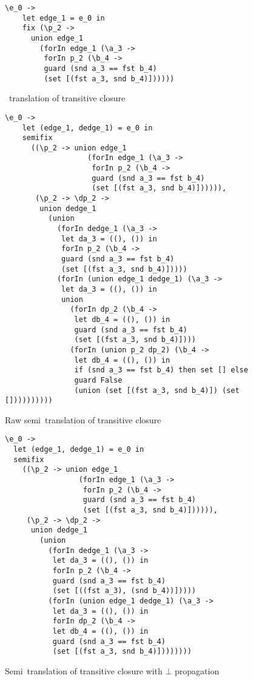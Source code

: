 \begin{figure}[p]\footnotesize
  \begin{lstlisting}[gobble=2]
  \e_0 ->
    let edge_1 = e_0 in
    fix (\p_2 ->
      union edge_1
        (forIn edge_1 (\a_3 ->
         forIn p_2 (\b_4 ->
         guard (snd a_3 == fst b_4)
         (set [(fst a_3, snd b_4)])))))
  \end{lstlisting}
  \caption{\Naive\ translation of transitive closure}
  \label{figure-trans-naive}
\end{figure}

\begin{figure}[p]\footnotesize
  \begin{lstlisting}[gobble=2]
  \e_0 ->
    let (edge_1, dedge_1) = e_0 in
    semifix
      ((\p_2 -> union edge_1
                   (forIn edge_1 (\a_3 ->
                    forIn p_2 (\b_4 ->
                    guard (snd a_3 == fst b_4)
                    (set [(fst a_3, snd b_4)]))))),
       (\p_2 -> \dp_2 ->
        union dedge_1
          (union
            (forIn dedge_1 (\a_3 ->
             let da_3 = ((), ()) in
             forIn p_2 (\b_4 ->
             guard (snd a_3 == fst b_4)
             (set [(fst a_3, snd b_4)]))))
            (forIn (union edge_1 dedge_1) (\a_3 ->
             let da_3 = ((), ()) in
             union
               (forIn dp_2 (\b_4 ->
                let db_4 = ((), ()) in
                guard (snd a_3 == fst b_4)
                (set [(fst a_3, snd b_4)])))
               (forIn (union p_2 dp_2) (\b_4 ->
                let db_4 = ((), ()) in
                if (snd a_3 == fst b_4) then set [] else
                guard False
                (union (set [(fst a_3, snd b_4)]) (set [])))))))))
  \end{lstlisting}
  \caption{Raw semi\naive\ translation of transitive closure}
  \label{figure-trans-seminaive-raw}
\end{figure}

\begin{figure}[p]\footnotesize
  \begin{lstlisting}
\e_0 ->
  let (edge_1, dedge_1) = e_0 in
  semifix
    ((\p_2 -> union edge_1
                 (forIn edge_1 (\a_3 ->
                  forIn p_2 (\b_4 ->
                  guard (snd a_3 == fst b_4)
                  (set [(fst a_3, snd b_4)]))))),
     (\p_2 -> \dp_2 ->
      union dedge_1
        (union
          (forIn dedge_1 (\a_3 ->
           let da_3 = ((), ()) in
           forIn p_2 (\b_4 ->
           guard (snd a_3 == fst b_4)
           (set [((fst a_3), (snd b_4))]))))
          (forIn (union edge_1 dedge_1) (\a_3 ->
           let da_3 = ((), ()) in
           forIn dp_2 (\b_4 ->
           let db_4 = ((), ()) in
           guard (snd a_3 == fst b_4)
           (set [(fst a_3, snd b_4)])))))))
  \end{lstlisting}
  \caption{Semi\naive\ translation of transitive closure with $\bot$ propagation}
  \label{figure-trans-seminaive-simple}
\end{figure}

